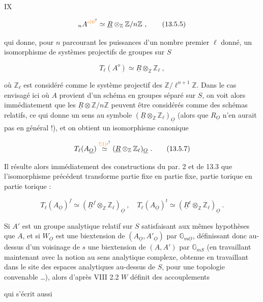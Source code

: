 
IX

\[
 {}_n A^{\unsure{o|0}}\simeq\underline R\otimes_{\mathbb Z}\mathbb Z/n\mathbb Z\ , \tag*{(13.5.5)}
\]

qui donne, pour $n$ parcourant les puissances d'un nombre premier $\ell$ donné, un isomorphisme de systèmes projectifs de groupes sur $S$

\[
 T_\ell(A^o)\simeq\underline R\otimes_{\mathbb Z}\mathbb Z_\ell\ , \tag*{(13.5.6)}
\]

où $\mathbb Z_\ell$ est considéré comme le système projectif des $\mathbb Z/\ell^{n+1}\mathbb Z$. Dans le cas envisagé ici où $A$ provient d'un schéma en groupes séparé sur $S$, on voit alors immédiatement que les $\underline R\otimes\mathbb Z/n\mathbb Z$ peuvent être considérés comme des schémas relatifs, ce qui donne un sens au symbole $(\underline R\otimes_{\mathbb Z}\mathbb Z_\ell)_{\underline O}$ (alors que $R_{\underline O}$ n'en aurait pas en général !), et on obtient un isomorphisme canonique

\[
 T_\ell(A_{\underline O})\overset{\handwritten{\unsure{!|1|\prime}}}{\simeq}(\underline R\otimes_{\mathbb Z}\mathbb Z_\ell)_{\underline O}\ . \tag*{(13.5.7)}
\]

Il résulte alors immédiatement des constructions du par. 2 et de 13.3 que l'isomorphisme précédent transforme partie fixe en partie fixe, partie torique en partie torique :

\[
 T_\ell(A_{\underline O})^f\simeq(\underline R^f\otimes_{\mathbb Z}\mathbb Z_\ell)_{\underline O}\ ,\quad T_\ell(A_{\underline O})^t\simeq(\underline R^t\otimes_{\mathbb Z}\mathbb Z_\ell)_{\underline O}\ . \tag*{(13.5.8)}
\]

Si $A'$ est un groupe analytique relatif sur $S$ satisfaisant aux mêmes hypothèses que $A$, et si $W_{\underline O}$ est une biextension de $(A_{\underline O},A'_{\underline O})$ par $\mathbb G_{m\underline O}$, définissant donc au-dessus d'un voisinage de $s$ une biextension de $(A,A')$ par $\mathbb G_{mS}$ (en travaillant maintenant avec la notion au sens analytique complexe, obtenue en travaillant dans le site des espaces analytiques au-dessus de $S$, pour une topologie convenable \ldots), alors d'après VIII 2.2 $W$ définit des accouplements




qui s'écrit aussi


